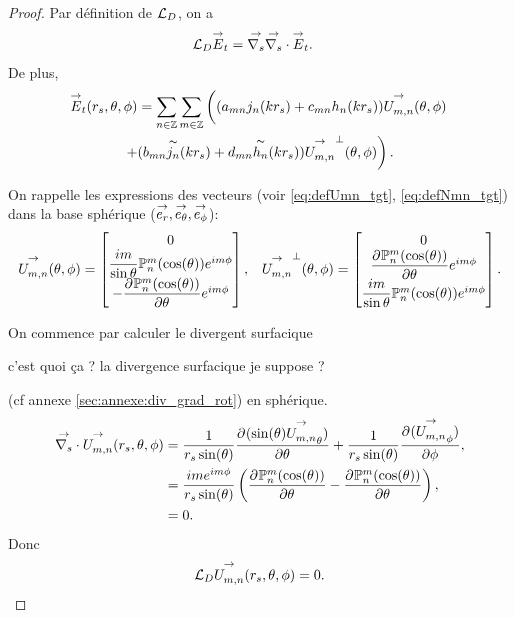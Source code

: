     \begin{proof}
      Par définition de \({\mathcal{L}_D}\), on a
      \begin{align*}
        {\mathcal{L}_D} {\overset{\rightarrow}{E}}_t & = {\overset{\rightarrow}{\nabla_s}}{} {\overset{\rightarrow}{\nabla_s}} \cdot{} {\overset{\rightarrow}{E}}_t.
      \end{align*}
      De plus, 
      \begin{multline*}
        {\overset{\rightarrow}{E}}_t(r_s,\theta,\phi) = \sum_{n\in\mathbb Z}\sum_{m\in\mathbb Z} \left( (a_{mn} j_n(kr_s) + c_{mn}h_n(kr_s)) {\overset{\rightarrow}{U_{m,n}^{{}}}}(\theta,\phi) 
        \right.
        \\
        \left.
        + (b_{mn} \overset{\thicksim}{j_n}(kr_s)+d_{mn} \overset{\thicksim}{h_n}(kr_s)) {\overset{\rightarrow}{U_{m,n}^{{}}}}^\perp(\theta,\phi)\right)
        .
      \end{multline*}

      On rappelle  les expressions des vecteurs (voir \eqref{eq:defUmn_tgt}, \eqref{eq:defNmn_tgt}) dans la base sphérique (\({\overset{\rightarrow}{e_r}},{\overset{\rightarrow}{e_\theta}},{\overset{\rightarrow}{e_\phi}}\)): 
      \begin{align*}
        {\overset{\rightarrow}{U_{m,n}^{{}}}}(\theta,\phi) =
        \begin{bmatrix}
            0
            \\
            \dfrac{im}{\sin\theta}\mathbb{P}^m_n(\cos(\theta))e^{im\phi}
            \\
            - \dfrac{\partial^{{}} \mathbb{P}^m_n(\cos(\theta))}{{\partial \theta}^{{}}}e^{im\phi}
        \end{bmatrix},
        &&
        {\overset{\rightarrow}{U_{m,n}^{{}}}}^\perp(\theta,\phi) =
        \begin{bmatrix}
          0
          \\
          \dfrac{\partial^{{}} \mathbb{P}^m_n(\cos(\theta))}{{\partial \theta}^{{}}}e^{im\phi}
          \\
          \dfrac{im}{\sin\theta}\mathbb{P}^m_n(\cos(\theta))e^{im\phi}
        \end{bmatrix}.
      \end{align*}

      On commence par calculer le divergent surfacique
\begin{REM}
  c'est quoi ça ? la divergence surfacique je suppose ?
\end{REM}
      (cf annexe \ref{sec:annexe:div_grad_rot}) en sphérique.
      \begin{align*}
        {\overset{\rightarrow}{\nabla_s}} \cdot{}{\overset{\rightarrow}{U_{m,n}^{{}}}}(r_s,\theta,\phi) &= \dfrac{1}{r_s\sin(\theta)} \dfrac{\partial^{{}} (\sin(\theta){\overset{\rightarrow}{U_{m,n}^{{}}}}_\theta)}{{\partial \theta}^{{}}} + \dfrac{1}{r_s\sin(\theta)}\dfrac{\partial^{{}} ({\overset{\rightarrow}{U_{m,n}^{{}}}}_\phi)}{{\partial \phi}^{{}}},
        \\
        &=\dfrac{ime^{im\phi}}{r_s\sin(\theta)}\left( \dfrac{\partial^{{}} \mathbb{P}^m_n(\cos(\theta))}{{\partial \theta}^{{}}} - \dfrac{\partial^{{}} \mathbb{P}^m_n(\cos(\theta))}{{\partial \theta}^{{}}} \right),
        \\
        &= 0.
      \end{align*}
      Donc 
      \begin{align*}
        {\mathcal{L}_D}{\overset{\rightarrow}{U_{m,n}^{{}}}}(r_s,\theta,\phi) = 0.
      \end{align*}


\end{proof}
